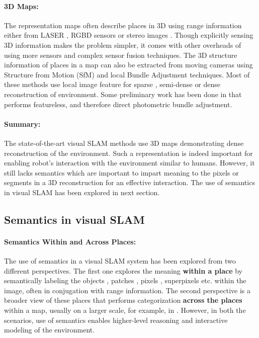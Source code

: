 \documentclass{article}
\begin{document}
\paragraph{3D Maps:}
The representation maps often describe places in 3D using range information either from LASER \cite{Paul2010,Stewart2012}, RGBD sensors \cite{Henry2012,Whelan2013} or stereo images \cite{CADENA,alismail2016direct,Davison2007}. Though explicitly sensing 3D information makes the problem simpler, it comes with other overheads of using more sensors and complex sensor fusion techniques. The 3D structure information of places in a map can also be extracted from moving cameras using Structure from Motion (SfM) \cite{beardsley1997sequential} and local Bundle Adjustment \cite{Triggs2000,Engels2006} techniques. Most of these methods use local image feature for sparse \cite{Davison2007, Mur-Artal2015}, semi-dense \cite{Engel2014lsd, Mur-Artal2015b} or dense \cite{Newcombe2011} reconstruction of environment. Some preliminary work has been done in \cite{alismail2016photometric} that performs featureless, and therefore direct photometric bundle adjustment.

\paragraph{Summary:}
The state-of-the-art visual SLAM methods use 3D maps demonstrating dense reconstruction of the environment. Such a representation is indeed important for enabling robot's interaction with the environment similar to humans. However, it still lacks semantics which are important to impart meaning to the pixels or segments in a 3D reconstruction for an effective interaction. The use of semantics in visual SLAM has been explored in next section.

\subsection{Semantics in visual SLAM}
\paragraph{Semantics Within and Across Places:}
The use of semantics in a visual SLAM system has been explored from two different perspectives. The first one explores the meaning \textbf{within a place} by semantically labeling the objects \cite{ranganathan2007semantic}, patches \cite{posner2008online}, pixels \cite{flint2010growing}, superpixels \cite{xiao2009multiple} etc. within the image, often in conjugation with range information. The second perspective is a broader view of these places that performs categorization \textbf{across the places} within a map, usually on a larger scale, for example, in \cite{stachniss2005semantic,sunderhauf2016place,pronobis2011semantic}. However, in both the scenarios, use of semantics enables higher-level reasoning and interactive modeling of the environment.
\end{document}
